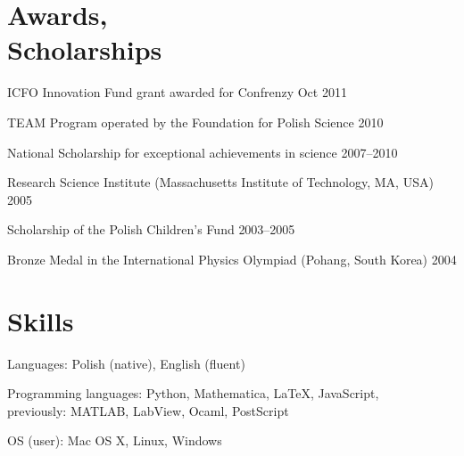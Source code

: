\documentclass[margin,line]{resume}
\begin{document}
\begin{resume}
    \section{\mysidestyle Awards,\\Scholarships}
    \begin{list2}
    	\item ICFO Innovation Fund grant awarded for Confrenzy \hfill { Oct 2011}
        \item TEAM Program operated by the Foundation for Polish Science \hfill { 2010}
        \item National Scholarship for exceptional achievements in science \hfill { 2007--2010}
        \item Research Science Institute (Massachusetts Institute of Technology, MA, USA) \hfill { 2005}
        \item Scholarship of the Polish Children's Fund \hfill { 2003--2005}
        \item Bronze Medal in the International Physics Olympiad (Pohang, South Korea) \hfill { 2004}
    \end{list2}


    \section{\mysidestyle Skills}
    \begin{list2}
        \item Languages: Polish (native), English (fluent)
        \item Programming languages: Python, Mathematica, LaTeX, JavaScript,\\
        previously: MATLAB, LabView, Ocaml, PostScript
        \item OS (user): Mac OS X, Linux, Windows
    \end{list2}


\end{resume}
\end{document}

